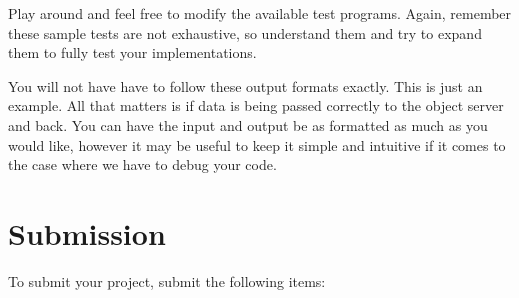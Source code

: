 \documentclass{article}
\begin{document}
\noindent Play around and feel free to modify the available test programs. Again, remember these sample tests are not exhaustive, so understand them and try to expand them to fully test your implementations.

\begin{info}
You will not have have to follow these output formats exactly. This is just an example. All that matters is if data is being passed correctly to the object server and back. You can have the input and output be as formatted as much as you would like, however it may be useful to keep it simple and intuitive if it comes to the case where we have to debug your code. 
\end{info}




\section{Submission } %
To submit your project, submit the following items:
\end{document}
